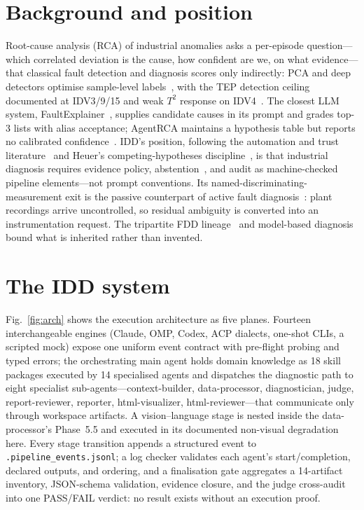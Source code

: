 \documentclass[10pt]{article}
\begin{document}
\section{Background and position}
Root-cause analysis (RCA) of industrial anomalies asks a per-episode question---which correlated deviation is the cause, how confident are we, on what evidence---that classical fault detection and diagnosis scores only indirectly: PCA and deep detectors optimise sample-level labels~\cite{qin2012survey,tuli2022tranad}, with the TEP detection ceiling documented at IDV3/9/15 and weak $T^2$ response on IDV4~\cite{russell2000delay,chiang2001fault}. The closest LLM system, FaultExplainer~\cite{khan2024faultexplainer}, supplies candidate causes in its prompt and grades top-3 lists with alias acceptance; AgentRCA maintains a hypothesis table but reports no calibrated confidence~\cite{wei2026agentrca}. IDD's position, following the automation and trust literature~\cite{parasuraman2000model,lee2004trust} and Heuer's competing-hypotheses discipline~\cite{heuer1999psychology}, is that industrial diagnosis requires evidence policy, abstention~\cite{chow1970optimum,angelopoulos2023conformal}, and audit as machine-checked pipeline elements---not prompt conventions. Its named-discriminating-measurement exit is the passive counterpart of active fault diagnosis~\cite{scott2014input}: plant recordings arrive uncontrolled, so residual ambiguity is converted into an instrumentation request. The tripartite FDD lineage~\cite{venkatasubramanian2003review} and model-based diagnosis~\cite{isermann2005model} bound what is inherited rather than invented.

\section{The IDD system}
Fig.~\ref{fig:arch} shows the execution architecture as five planes. Fourteen interchangeable engines (Claude, OMP, Codex, ACP dialects, one-shot CLIs, a scripted mock) expose one uniform event contract with pre-flight probing and typed errors; the orchestrating main agent holds domain knowledge as 18 skill packages executed by 14 specialised agents and dispatches the diagnostic path to eight specialist sub-agents---context-builder, data-processor, diagnostician, judge, report-reviewer, reporter, html-visualizer, html-reviewer---that communicate only through workspace artifacts. A vision--language stage is nested inside the data-processor's Phase~5.5 and executed in its documented non-visual degradation here. Every stage transition appends a structured event to \texttt{.pipeline\_events.jsonl}; a log checker validates each agent's start/completion, declared outputs, and ordering, and a finalisation gate aggregates a 14-artifact inventory, JSON-schema validation, evidence closure, and the judge cross-audit into one PASS/FAIL verdict: no result exists without an execution proof.
\end{document}
